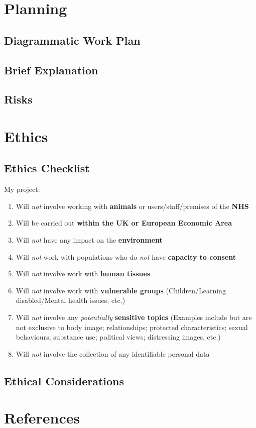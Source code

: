 \documentclass[a4paper]{article}
\begin{document}
\section{Planning}
\subsection{Diagrammatic Work Plan}

\subsection{Brief Explanation}

\subsection{Risks}


\clearpage

\section{Ethics}
\subsection{Ethics Checklist}
My project:
\begin{enumerate}
    \item Will \textit{not} involve working with \textbf{animals} or
        users/staff/premises of the \textbf{NHS}
    \item Will be carried out \textbf{within the UK or European
        Economic Area}
    \item Will \textit{not} have any impact on the \textbf{environment}
    \item Will \textit{not} work with populations who do \textit{not}
        have \textbf{capacity to consent}
    \item Will \textit{not} involve work with \textbf{human tissues}
    \item Will \textit{not} involve work with \textbf{vulnerable groups}
        (Children/Learning disabled/Mental health issues, etc.)
    \item Will \textit{not} involve any \textit{potentially}
        \textbf{sensitive topics} (Examples include but are not
        exclusive to body image; relationships; protected
        characteristics; sexual behaviours; substance use;
        political views; distressing images, etc.)
    \item Will \textit{not} involve the collection of any identifiable
        personal data
\end{enumerate}

\subsection{Ethical Considerations}

\clearpage


\section{References}
\end{document}
